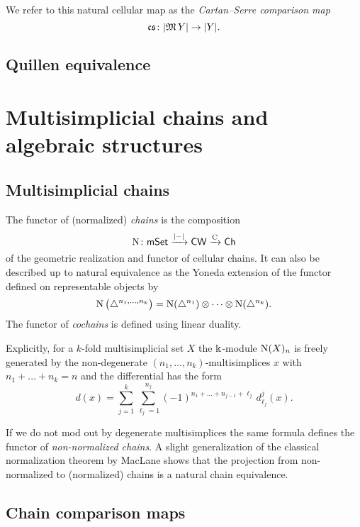 
We refer to this natural cellular map as the \textit{Cartan--Serre comparison map}
\[
\operatorname{\mathfrak{cs}} \colon \lvert\operatorname{\mathfrak{M}} Y\rvert \to \lvert Y\rvert.
\]

\subsection{Quillen equivalence}


\section{Multisimplicial chains and algebraic structures}


\subsection{Multisimplicial chains}

The functor of (normalized) \textit{chains} is the composition
\[
\operatorname{N} \colon \mathsf{mSet} \xrightarrow{\lvert-\rvert} \mathsf{CW} \xrightarrow{\operatorname{C}} \mathsf{Ch}
\]
of the geometric realization and functor of cellular chains.
It can also be described up to natural equivalence as the Yoneda extension of the functor defined on representable objects by
\[
\operatorname{N} \big( \triangle^{n_1, \dots, n_k} \big) =
\operatorname{N}(\triangle^{n_1}) \otimes \dotsb \otimes \operatorname{N}(\triangle^{n_k}).
\]
The functor of \textit{cochains} is defined using linear duality.

Explicitly, for a $k$-fold multisimplicial set $X$ the $\Bbbk$-module $\operatorname{N}(X)_n$ is freely generated by the non-degenerate $(n_1, \dots, n_k)$-multisimplices $x$ with $n_1 + \dots + n_k = n$ and the differential has the form
\[
d(x) = \sum_{j=1}^k \sum_{\ell_j=1}^{n_j}
(-1)^{n_{1}+\dots+n_{j-1}+\ell_j} \, d^j_{\ell_j}(x).
\]

If we do not mod out by degenerate multisimplices the same formula defines the functor of \textit{non-normalized chains}.
A slight generalization of the classical normalization theorem by MacLane \cite{MacLane} shows that the projection from non-normalized to (normalized) chains is a natural chain equivalence.

\subsection{Chain comparison maps} \label{ss:comparison chain maps}


